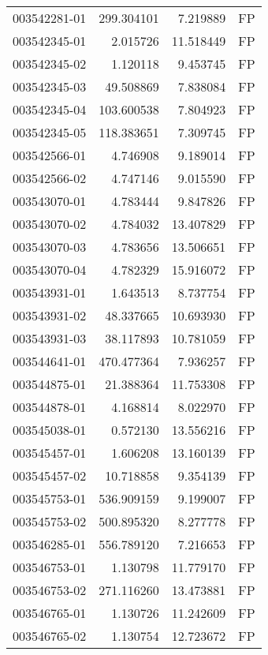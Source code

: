 \begin{tabular}{lrrl}
003542281-01 &  299.304101 &       7.219889 &   FP \\
003542345-01 &    2.015726 &      11.518449 &   FP \\
003542345-02 &    1.120118 &       9.453745 &   FP \\
003542345-03 &   49.508869 &       7.838084 &   FP \\
003542345-04 &  103.600538 &       7.804923 &   FP \\
003542345-05 &  118.383651 &       7.309745 &   FP \\
003542566-01 &    4.746908 &       9.189014 &   FP \\
003542566-02 &    4.747146 &       9.015590 &   FP \\
003543070-01 &    4.783444 &       9.847826 &   FP \\
003543070-02 &    4.784032 &      13.407829 &   FP \\
003543070-03 &    4.783656 &      13.506651 &   FP \\
003543070-04 &    4.782329 &      15.916072 &   FP \\
003543931-01 &    1.643513 &       8.737754 &   FP \\
003543931-02 &   48.337665 &      10.693930 &   FP \\
003543931-03 &   38.117893 &      10.781059 &   FP \\
003544641-01 &  470.477364 &       7.936257 &   FP \\
003544875-01 &   21.388364 &      11.753308 &   FP \\
003544878-01 &    4.168814 &       8.022970 &   FP \\
003545038-01 &    0.572130 &      13.556216 &   FP \\
003545457-01 &    1.606208 &      13.160139 &   FP \\
003545457-02 &   10.718858 &       9.354139 &   FP \\
003545753-01 &  536.909159 &       9.199007 &   FP \\
003545753-02 &  500.895320 &       8.277778 &   FP \\
003546285-01 &  556.789120 &       7.216653 &   FP \\
003546753-01 &    1.130798 &      11.779170 &   FP \\
003546753-02 &  271.116260 &      13.473881 &   FP \\
003546765-01 &    1.130726 &      11.242609 &   FP \\
003546765-02 &    1.130754 &      12.723672 &   FP \\

\end{tabular}
